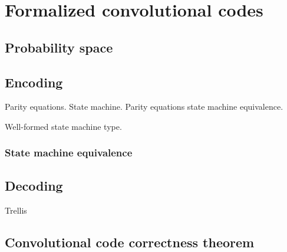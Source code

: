 \chapter{Formalized convolutional codes}

\section{Probability space}

\section{Encoding}

Parity equations. State machine. Parity equations state machine equivalence.

Well-formed state machine type.

\subsection{State machine equivalence}

\section{Decoding}

Trellis

\section{Convolutional code correctness theorem}